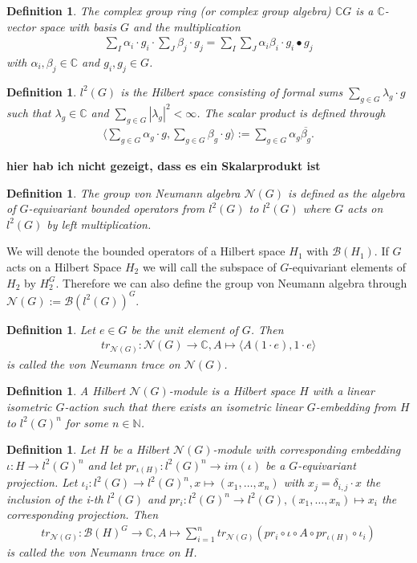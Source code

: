 \documentclass[12pt,a4paper]{scrartcl}
\newtheorem{Definition}[Theorem]{Definition}
\numberwithin{equation}{section}
\newcommand{\C}{\mathbb{C}} %
\newcommand{\N}{\mathbb{N}} %
\newcommand{\2}{\mathbb{Z} / 2 \mathbb{Z}}
\begin{document}
\begin{Definition}
	The complex group ring (or complex group algebra) $\C G$ is a $\C$-vector space with basis $G$ and the multiplication
	\begin{align*}
		\sum_I \alpha_i \cdot g_i \cdot \sum_J \beta_j \cdot g_j = \sum_I \sum_J \alpha_i \beta_i \cdot g_i \bullet g_j
	\end{align*}
	with $\alpha_i, \beta_j \in \C$ and $g_i, g_j \in G$.
\end{Definition}
\begin{Definition}
	$l^2(G)$ is the Hilbert space consisting of formal sums $\sum_{g \in G} \lambda_g \cdot g$ such that $\lambda_g \in \C$ and $\sum_{g \in G} |\lambda_g|^2 < \infty$. The scalar product is defined through
	\begin{align*}
		\langle \sum_{g \in G} \alpha_g \cdot g, \sum_{g \in G} \beta_g \cdot g \rangle := \sum_{g \in G} \alpha_g \overline{\beta_g}.
	\end{align*}
\end{Definition}
\textbf{hier hab ich nicht gezeigt, dass es ein Skalarprodukt ist}
\begin{Definition}
	The group von Neumann algebra $\mathcal{N}(G)$ is defined as the algebra of $G$-equivariant bounded operators from $l^2(G)$ to $l^2(G)$ where $G$ acts on $l^2(G)$ by left multiplication.
\end{Definition}
We will denote the bounded operators of a Hilbert space $H_1$ with $\mathcal{B}(H_1)$. If $G$ acts on a Hilbert Space $H_2$ we will call the subspace of $G$-equivariant elements of $H_2$ by $H_2^G$. Therefore we can also define the group von Neumann algebra through $\mathcal{N}(G) := \mathcal{B}(l^2(G))^G$.
\begin{Definition}
	Let $e \in G$ be the unit element of $G$. Then
	\begin{align*}
		tr_{\mathcal{N}(G)}: \mathcal{N}(G) \to \C, A  \mapsto \langle A(1 \cdot e), 1 \cdot e \rangle
	\end{align*}
	is called the von Neumann trace on $\mathcal{N}(G)$.
\end{Definition}
\begin{Definition}
	A Hilbert $\mathcal{N}(G)$-module is a Hilbert space $H$ with a linear isometric $G$-action such that there exists an isometric linear $G$-embedding from $H$ to $l^2(G)^n$ for some $n \in \N$.
\end{Definition}
\begin{Definition}
	Let $H$ be a Hilbert $\mathcal{N}(G)$-module with corresponding embedding $\iota: H \to l^2(G)^n$ and let $pr_{\iota(H)}: l^2(G)^n \to im(\iota)$ be a $G$-equivariant projection. Let $\iota_i: l^2(G) \to l^2(G)^n, x \mapsto (x_1, \ldots, x_n)$ with $x_j = \delta_{i,j} \cdot x$ the inclusion of the i-th $l^2(G)$ and $pr_i: l^2(G)^n \to l^2(G), (x_1, \ldots, x_n) \mapsto x_i$ the corresponding projection. Then 
	\begin{align*}
		tr_{\mathcal{N}(G)}: \mathcal{B}(H)^G \to \C, A \mapsto \sum_{i = 1}^{n} tr_{\mathcal{N}(G)}(pr_i \circ \iota \circ A \circ pr_{\iota(H)} \circ \iota_i)
	\end{align*}
	is called the von Neumann trace on $H$.
\end{Definition}
\end{document}
